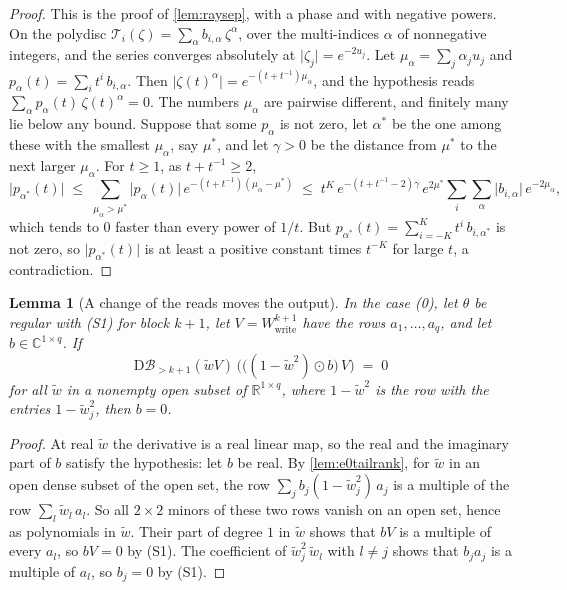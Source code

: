 \documentclass[10pt]{article}
\newtheorem{lemma}[theorem]{Lemma}
\theoremstyle{definition}
\theoremstyle{remark}
\newcommand{\R}{\mathbb{R}}
\newcommand{\Wwrite}{W_{\mathrm{write}}}
\newcommand{\Der}{\mathrm{D}}
\begin{document}
\begin{proof}
This is the proof of \cref{lem:raysep}, with a phase and with negative powers. On the polydisc $\mathcal T_i(\zeta) = \sum_\alpha b_{i,\alpha}\,\zeta^\alpha$, over the multi-indices $\alpha$ of nonnegative integers, and the series converges absolutely at $\lvert\zeta_j\rvert = e^{-2u_j}$. Let $\mu_\alpha = \sum_j\alpha_ju_j$ and $p_\alpha(t) = \sum_i t^i\,b_{i,\alpha}$. Then $\lvert\zeta(t)^\alpha\rvert = e^{-(t + t^{-1})\mu_\alpha}$, and the hypothesis reads $\sum_\alpha p_\alpha(t)\,\zeta(t)^\alpha = 0$. The numbers $\mu_\alpha$ are pairwise different, and finitely many lie below any bound. Suppose that some $p_\alpha$ is not zero, let $\alpha^*$ be the one among these with the smallest $\mu_\alpha$, say $\mu^*$, and let $\gamma > 0$ be the distance from $\mu^*$ to the next larger $\mu_\alpha$. For $t \ge 1$, as $t + t^{-1} \ge 2$,
\[
\lvert p_{\alpha^*}(t)\rvert \;\le\; \sum_{\mu_\alpha > \mu^*}\lvert p_\alpha(t)\rvert\,e^{-(t + t^{-1})(\mu_\alpha - \mu^*)} \;\le\; t^K\,e^{-(t + t^{-1} - 2)\gamma}\,e^{2\mu^*}\sum_{i}\sum_\alpha\lvert b_{i,\alpha}\rvert\,e^{-2\mu_\alpha},
\]
which tends to $0$ faster than every power of $1/t$. But $p_{\alpha^*}(t) = \sum_{i=-K}^{K}t^i\,b_{i,\alpha^*}$ is not zero, so $\lvert p_{\alpha^*}(t)\rvert$ is at least a positive constant times $t^{-K}$ for large $t$, a contradiction.
\end{proof}

\begin{lemma}[A change of the reads moves the output]\label{lem:e0wedge}
In the case (0), let $\theta$ be regular with (S1) for block $k+1$, let $V = \Wwrite^{k+1}$ have the rows $a_1, \dots, a_q$, and let $b \in \mathbb C^{1\times q}$. If
\[
\Der\mathcal B_{>k+1}(\tilde wV)\,\Big(\big((1 - \tilde w^2)\odot b\big)\,V\Big) \;=\; 0
\]
for all $\tilde w$ in a nonempty open subset of $\R^{1\times q}$, where $1 - \tilde w^2$ is the row with the entries $1 - \tilde w_j^2$, then $b = 0$.
\end{lemma}

\begin{proof}
At real $\tilde w$ the derivative is a real linear map, so the real and the imaginary part of $b$ satisfy the hypothesis: let $b$ be real. By \cref{lem:e0tailrank}, for $\tilde w$ in an open dense subset of the open set, the row $\sum_j b_j(1 - \tilde w_j^2)\,a_j$ is a multiple of the row $\sum_l\tilde w_l\,a_l$. So all $2\times2$ minors of these two rows vanish on an open set, hence as polynomials in $\tilde w$. Their part of degree $1$ in $\tilde w$ shows that $bV$ is a multiple of every $a_l$, so $bV = 0$ by (S1). The coefficient of $\tilde w_j^2\,\tilde w_l$ with $l \neq j$ shows that $b_ja_j$ is a multiple of $a_l$, so $b_j = 0$ by (S1).
\end{proof}
\end{document}
